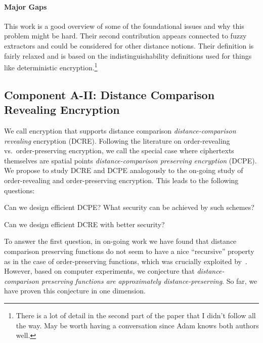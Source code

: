 \paragraph{Major Gaps}
This work is a good overview of some of the foundational issues and why this problem might be hard.  Their second contribution appears connected to fuzzy extractors and could be considered for other distance notions.  Their definition is fairly relaxed and is based on the indistinguishability definitions used for things like deterministic encryption.\footnote{There is a lot of detail in the second part of the paper that I didn't follow all the way.  May be worth having a conversation since Adam knows both authors well.}



\subsection{Component A-II: Distance Comparison Revealing Encryption}
We call encryption that supports distance comparison \emph{distance-comparison revealing} encryption (DCRE).  Following the literature on order-revealing vs.~order-preserving encryption, we call the special case where ciphertexts themselves are spatial points \emph{distance-comparison preserving encryption} (DCPE).  We propose to study DCRE and DCPE analogously to the on-going study of order-revealing and order-preserving encryption.  
This leads to the following questions:

\begin{question}
Can we design efficient DCPE?  What security can be achieved by such schemes?
\end{question}


\begin{question}
Can we design efficient DCRE with better security?
\end{question}

To answer the first question, in on-going work we have found that distance comparison preserving functions do not seem to have a nice ``recursive'' property as in the case of order-preserving functions, which was crucially exploited by~\cite{EC:BCLO09}.  However, based on computer experiments, we conjecture that \emph{distance-comparison preserving functions are approximately distance-preserving}.    So far, we have proven this conjecture in one dimension.

